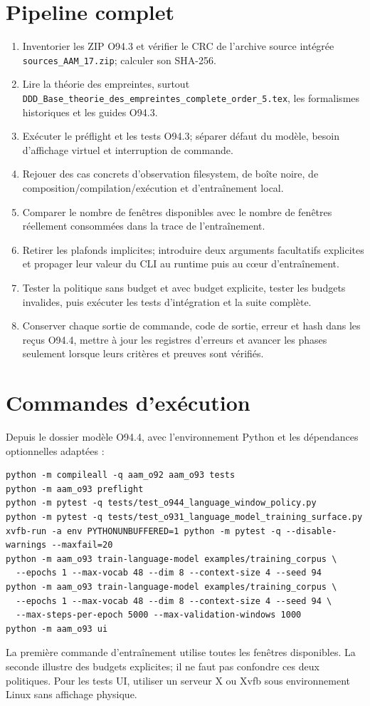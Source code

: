 \documentclass[11pt,a4paper]{article}
\begin{document}
\section{Pipeline complet}
\begin{enumerate}
\item Inventorier les ZIP O94.3 et vérifier le CRC de l'archive source intégrée \texttt{sources\_AAM\_17.zip}; calculer son SHA-256.
\item Lire la théorie des empreintes, surtout \texttt{DDD\_Base\_theorie\_des\_empreintes\_complete\_order\_5.tex}, les formalismes historiques et les guides O94.3.
\item Exécuter le préflight et les tests O94.3; séparer défaut du modèle, besoin d'affichage virtuel et interruption de commande.
\item Rejouer des cas concrets d'observation filesystem, de boîte noire, de composition/compilation/exécution et d'entraînement local.
\item Comparer le nombre de fenêtres disponibles avec le nombre de fenêtres réellement consommées dans la trace de l'entraînement.
\item Retirer les plafonds implicites; introduire deux arguments facultatifs explicites et propager leur valeur du CLI au runtime puis au cœur d'entraînement.
\item Tester la politique sans budget et avec budget explicite, tester les budgets invalides, puis exécuter les tests d'intégration et la suite complète.
\item Conserver chaque sortie de commande, code de sortie, erreur et hash dans les reçus O94.4, mettre à jour les registres d'erreurs et avancer les phases seulement lorsque leurs critères et preuves sont vérifiés.
\end{enumerate}

\section{Commandes d'exécution}
Depuis le dossier modèle O94.4, avec l'environnement Python et les dépendances optionnelles adaptées :
\begin{verbatim}
python -m compileall -q aam_o92 aam_o93 tests
python -m aam_o93 preflight
python -m pytest -q tests/test_o944_language_window_policy.py
python -m pytest -q tests/test_o931_language_model_training_surface.py
xvfb-run -a env PYTHONUNBUFFERED=1 python -m pytest -q --disable-warnings --maxfail=20
python -m aam_o93 train-language-model examples/training_corpus \
  --epochs 1 --max-vocab 48 --dim 8 --context-size 4 --seed 94
python -m aam_o93 train-language-model examples/training_corpus \
  --epochs 1 --max-vocab 48 --dim 8 --context-size 4 --seed 94 \
  --max-steps-per-epoch 5000 --max-validation-windows 1000
python -m aam_o93 ui
\end{verbatim}
La première commande d'entraînement utilise toutes les fenêtres disponibles. La seconde illustre des budgets explicites; il ne faut pas confondre ces deux politiques. Pour les tests UI, utiliser un serveur X ou Xvfb sous environnement Linux sans affichage physique.
\end{document}
